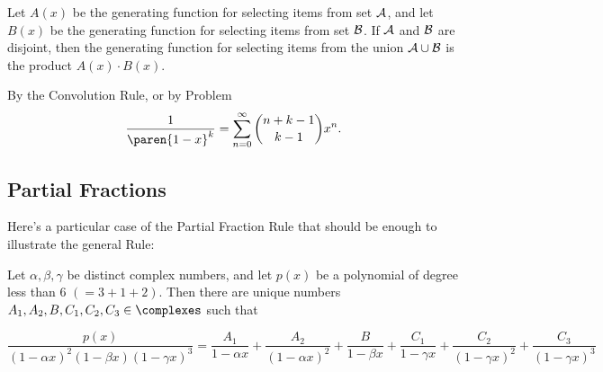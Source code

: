 \documentclass[handout]{mcs}
\begin{document}
\begin{mathrule}
Let $A(x)$ be the generating function for selecting items from set
${\cal A}$, and let $B(x)$ be the generating function for selecting
items from set ${\cal B}$.  If ${\cal A}$ and ${\cal B}$ are disjoint,
then the generating function for selecting items from the union ${\cal
A} \cup {\cal B}$ is the product $A(x) \cdot B(x)$.
\end{mathrule}

By the Convolution Rule, or by Problem %
\[
\frac{1}{\paren{1-x}^k} = \sum_{n=0}^\infty \binom{n+k-1}{k-1}x^n.
\]

\subsection{Partial Fractions}

Here's a particular case of the Partial Fraction Rule that should be
enough to illustrate the general Rule:

Let $\alpha, \beta, \gamma$ be distinct complex numbers, and
let $p(x)$ be a polynomial of degree less than 6 $(= 3+1+2)$.  Then
there are unique numbers $A_1,A_2,B,C_1,C_2,C_3 \in \complexes$ such that

\[
\frac{p(x)}{(1-\alpha x)^2 (1-\beta x) (1-\gamma x)^3}
= \frac{A_1}{1-\alpha x} + \frac{A_2}{(1-\alpha x)^2}
+ \frac{B}{1-\beta x}
+ \frac{C_1}{1-\gamma x} + \frac{C_2}{(1-\gamma x)^2} + \frac{C_3}{(1-\gamma x)^3}
\]
\end{document}
